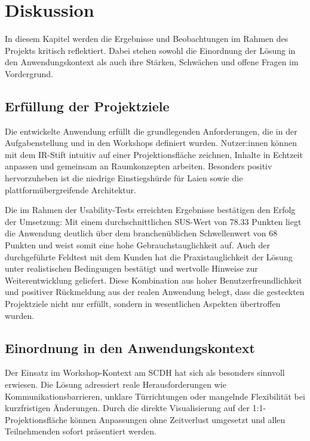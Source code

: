 \section{Diskussion}

In diesem Kapitel werden die Ergebnisse und Beobachtungen im Rahmen des Projekts kritisch reflektiert. Dabei stehen sowohl die Einordnung der Lösung in den Anwendungskontext als auch ihre Stärken, Schwächen und offene Fragen im Vordergrund.

\subsection{Erfüllung der Projektziele}

Die entwickelte Anwendung erfüllt die grundlegenden Anforderungen, die in der Aufgabenstellung und in den Workshops definiert wurden.  
Nutzer:innen können mit dem IR-Stift intuitiv auf einer Projektionsfläche zeichnen, Inhalte in Echtzeit anpassen und gemeinsam an Raumkonzepten arbeiten.  
Besonders positiv hervorzuheben ist die niedrige Einstiegshürde für Laien sowie die plattformübergreifende Architektur.

Die im Rahmen der Usability-Tests erreichten Ergebnisse bestätigen den Erfolg der Umsetzung: Mit einem durchschnittlichen SUS-Wert von 78.33 Punkten liegt die Anwendung deutlich über dem branchenüblichen Schwellenwert von 68 Punkten und weist somit eine hohe Gebrauchstauglichkeit auf.  
Auch der durchgeführte Feldtest mit dem Kunden hat die Praxistauglichkeit der Lösung unter realistischen Bedingungen bestätigt und wertvolle Hinweise zur Weiterentwicklung geliefert.  
Diese Kombination aus hoher Benutzerfreundlichkeit und positiver Rückmeldung aus der realen Anwendung belegt, dass die gesteckten Projektziele nicht nur erfüllt, sondern in wesentlichen Aspekten übertroffen wurden.


\subsection{Einordnung in den Anwendungskontext}

Der Einsatz im Workshop-Kontext am SCDH hat sich als besonders sinnvoll erwiesen.  
Die Lösung adressiert reale Herausforderungen wie Kommunikationsbarrieren, unklare Türrichtungen oder mangelnde Flexibilität bei kurzfristigen Änderungen.  
Durch die direkte Visualisierung auf der 1:1-Projektionsfläche können Anpassungen ohne Zeitverlust umgesetzt und allen Teilnehmenden sofort präsentiert werden.

